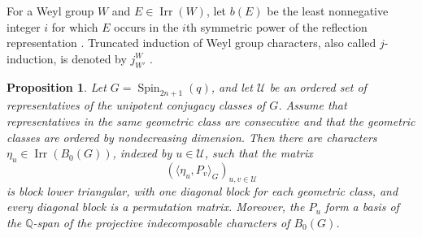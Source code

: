 \documentclass[10pt]{amsart}
\newtheorem{proposition}[theorem]{Proposition}
\theoremstyle{definition}
\DeclareMathOperator{\Irr}{Irr}
\numberwithin{equation}{section}
\numberwithin{table}{section}
\begin{document}
For a Weyl group $W$ and $E\in\Irr(W)$, let $b(E)$ be the
least nonnegative integer $i$ for which $E$ occurs in the $i$th symmetric
power of the reflection representation \cite[4.1.1]{GeckMalle2020}.
Truncated induction of Weyl group characters, also called
$j$-induction, is denoted by $j_{W'}^W$
\cite[p.~476]{Taylor2014Maximal}.

\begin{proposition}\label{prop:type-b-gggr-rank}
Let $G=\operatorname{Spin}_{2n+1}(q)$, and let $\mathcal U$ be an ordered set
of representatives of the unipotent conjugacy classes of $G$. Assume that
representatives in the same geometric class are consecutive and that the
geometric classes are ordered by nondecreasing dimension. Then there are
characters $\eta_u\in\Irr(B_0(G))$, indexed by $u\in\mathcal U$, such that the
matrix
\[
 (\langle\eta_u,P_v\rangle_G)_{u,v\in\mathcal U}
\]
is block lower triangular, with one diagonal block for each geometric class,
and every diagonal block is a permutation matrix. Moreover, the $P_u$ form a
basis of the $\mathbb Q$-span of the projective indecomposable characters of
$B_0(G)$.
\end{proposition}
\end{document}
